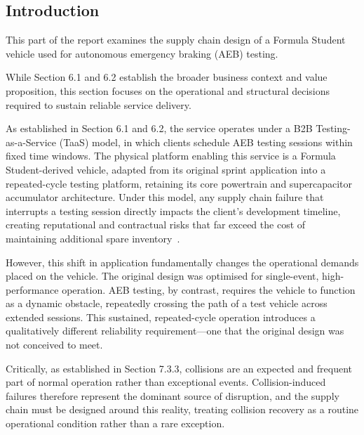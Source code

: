 \documentclass[11pt, a4paper]{report}
\numberwithin{equation}{section}
\begin{document}
\begin{refsection}
\graphicspath{{../YuzeJiang/Business/figures/}{../YuzeJiang/Business/}}

\section{Introduction}

This part of the report examines the supply chain design of a Formula Student vehicle used for autonomous emergency braking (AEB) testing.

While Section 6.1 and 6.2 establish the broader business context and value proposition, this section focuses on the operational and structural decisions required to sustain reliable service delivery.

As established in Section 6.1 and 6.2, the service operates under a B2B Testing-as-a-Service (TaaS) model, in which clients schedule AEB testing sessions within fixed time windows. The physical platform enabling this service is a Formula Student-derived vehicle, adapted from its original sprint application into a repeated-cycle testing platform, retaining its core powertrain and supercapacitor accumulator architecture. Under this model, any supply chain failure that interrupts a testing session directly impacts the client's development timeline, creating reputational and contractual risks that far exceed the cost of maintaining additional spare inventory~\cite{startup_reputation}.

However, this shift in application fundamentally changes the operational demands placed on the vehicle. The original design was optimised for single-event, high-performance operation. AEB testing, by contrast, requires the vehicle to function as a dynamic obstacle, repeatedly crossing the path of a test vehicle across extended sessions. This sustained, repeated-cycle operation introduces a qualitatively different reliability requirement—one that the original design was not conceived to meet.

Critically, as established in Section 7.3.3, collisions are an expected and frequent part of normal operation rather than exceptional events. Collision-induced failures therefore represent the dominant source of disruption, and the supply chain must be designed around this reality, treating collision recovery as a routine operational condition rather than a rare exception.


\end{refsection}
\end{document}
